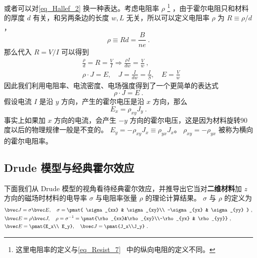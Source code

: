 或者可以对\autoref{eq_Hallef_2} 换一种表达。考虑电阻率 $\rho$
\footnote{这里电阻率的定义与\autoref{eq_Resist_7}~ 中的纵向电阻的定义不同。} ，由于霍尔电阻只和材料的厚度 $d$ 有关，和另两条边的长度 $w,L$ 无关，所以可以定义电阻率 $\rho$ 为 $R\equiv\rho /d$，
\begin{equation}\label{eq_Hallef_3}
\rho\equiv Rd=\frac{B}{ne}~.
\end{equation}
那么代入 $R=V/I$ 可以得到
\begin{equation}
\begin{aligned}
&\frac{\rho }{d} =R= \frac{V}{I}\Rightarrow \frac{\rho I}{dw}=\frac{V}{w}~,\\
&\rho \cdot J = E,\quad J= \frac{I}{dw}=\frac{I}{S},\quad E=\frac{V}{w}
\end{aligned}
\end{equation}
因此我们利用电阻率、电流密度、电场强度得到了一个更简单的表达式
\begin{equation}
\rho\cdot J=E~.
\end{equation}
假设电流 $I$ 是沿 $y$ 方向，产生的霍尔电压是沿 $x$ 方向，那么
\begin{equation}
E_x = \rho_{xy} J_y~.
\end{equation}
事实上如果加 $x$ 方向的电流，会产生 $-y$ 方向的霍尔电压，这是因为材料旋转90度以后的物理规律一般是不变的。 $E_y=-\rho_{xy} J_x\equiv \rho_{yx}J_x$。
$\rho_{xy}=-\rho_{yx}$ 被称为横向的霍尔电阻率。

\subsection{Drude 模型与经典霍尔效应}
下面我们从 Drude 模型的视角看待经典霍尔效应，并推导出它当对\textbf{二维材料}加 $z$ 方向的磁场时材料的电导率 $\sigma$ 与电阻率张量 $\rho$ 的理论计算结果。 $\sigma$ 与 $\rho$ 的定义为
\begin{equation}
\begin{aligned}
&\bvec J=\sigma \bvec E,\quad \sigma=\pmat{
    \sigma_{xx} & \sigma_{xy}\\
    -\sigma_{yx} & \sigma_{yy}
}
~,\\
&\bvec E=\rho \bvec J,\quad \rho = \sigma^{-1} =
\pmat{\rho_{xx}&\rho_{xy}\\-\rho_{yx} & \rho_{yy}}~,\\
&\bvec E=\pmat{E_x\\ E_y},\quad \bvec J = \pmat{J_x\\J_y}~.
\end{aligned}
\end{equation}

